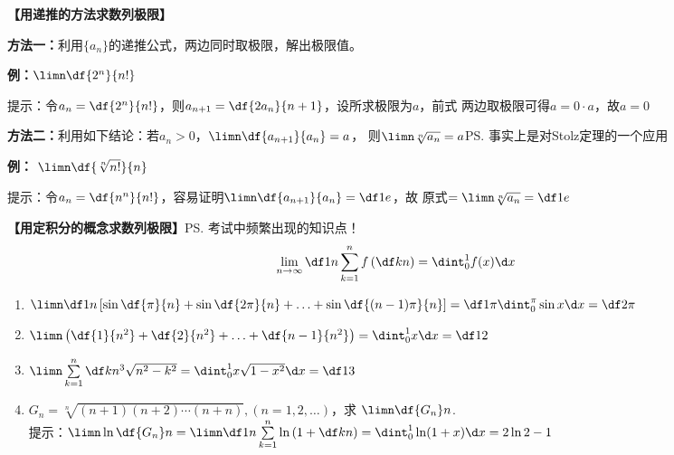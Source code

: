 \bigskip
{\bf 【用递推的方法求数列极限】}

{\bf 方法一：}利用$\{a_n\}$的递推公式，两边同时取极限，解出极限值。

{\bf 例：}$\limn\df{2^n}{n!}$

提示：令$a_n=\df{2^n}{n!}$，则$a_{n+1}=\df{2a_n}{n+1}$，设所求极限为$a$，前式
两边取极限可得$a=0\cdot a$，故$a=0$

{\bf 方法二：}利用如下结论：若$a_n>0$，$\limn\df{a_{n+1}}{a_n}=a$，
则$\limn\sqrt[n]{a_n}=a$\ps{事实上是对Stolz定理的一个应用}

{\bf 例：} $\limn\df{\sqrt[n]{n!}}{n}$

提示：令$a_n=\df{n^n}{n!}$，容易证明$\limn\df{a_{n+1}}{a_n}=\df1e$，故
原式$=\limn\sqrt[n]{a_n}=\df1e$

\bigskip
{\bf 【用定积分的概念求数列极限】}\ps{考试中频繁出现的知识点！}
$$\lim\limits_{n\to\infty}\df 1n\sum\limits_{k=1}^n
    f\left(\df kn\right)=\dint_0^1f(x)\d x$$
\begin{enumerate}[(1)]
  \setlength{\itemindent}{1cm}
  \item $\limn\df 1n\left[\sin\df{\pi}{n}+\sin\df{2\pi}{n}+\ldots
		  +\sin\df{(n-1)\pi}{n}\right]=\df1{\pi}\dint_0^{\pi}\sin x\d x
		  =\df2{\pi}$
  \item $\limn\left(\df{1}{n^2}+\df{2}{n^2}+\ldots+\df{n-1}{n^2}\right)
  =\dint_0^1x\d x=\df12$
  \item $\limn\sum\limits_{k=1}^n\df k{n^3}\sqrt{n^2-k^2}
  =\dint_0^1x\sqrt{1-x^2}\d x=\df13$
  \item $G_n=\sqrt[n]{(n+1)(n+2)\cdots(n+n)},(n=1,2,\ldots)$，求
	$\limn\df{G_n}n$.\\
  提示：$\limn\ln\df{G_n}n=\limn\df1n\sum\limits_{k=1}^n\ln\left(1+\df kn\right)
=\dint_0^1\ln(1+x)\d x=2\ln2-1$
\end{enumerate}

